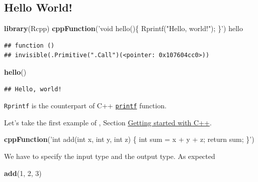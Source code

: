 \documentclass[]{book}
\newenvironment{Shaded}{\begin{snugshade}}{\end{snugshade}}
\newcommand{\KeywordTok}[1]{\textcolor[rgb]{0.13,0.29,0.53}{\textbf{#1}}}
\newcommand{\DecValTok}[1]{\textcolor[rgb]{0.00,0.00,0.81}{#1}}
\newcommand{\StringTok}[1]{\textcolor[rgb]{0.31,0.60,0.02}{#1}}
\newcommand{\NormalTok}[1]{#1}
\theoremstyle{definition}
\theoremstyle{definition}
\theoremstyle{definition}
\theoremstyle{remark}
\begin{document}
\subsection{Hello World!}\label{hello-world}

\begin{Shaded}
\begin{Highlighting}[]
\KeywordTok{library}\NormalTok{(Rcpp)}
\KeywordTok{cppFunction}\NormalTok{(}\StringTok{'void hello()\{}
\StringTok{  Rprintf("Hello, world!");}
\StringTok{\}'}\NormalTok{)}
\NormalTok{hello}
\end{Highlighting}
\end{Shaded}

\begin{verbatim}
## function () 
## invisible(.Primitive(".Call")(<pointer: 0x107604cc0>))
\end{verbatim}

\begin{Shaded}
\begin{Highlighting}[]
\KeywordTok{hello}\NormalTok{()}
\end{Highlighting}
\end{Shaded}

\begin{verbatim}
## Hello, world!
\end{verbatim}

\texttt{Rprintf} is the counterpart of C++
\href{http://www.cplusplus.com/reference/cstdio/printf/}{\texttt{printf}}
function.

Let's take the first example of \citet{Wickham2014}, Section
\href{http://adv-r.had.co.nz/Rcpp.html\#rcpp-intro}{Getting started with
C++}.

\begin{Shaded}
\begin{Highlighting}[]
\KeywordTok{cppFunction}\NormalTok{(}\StringTok{'int add(int x, int y, int z) \{}
\StringTok{  int sum = x + y + z;}
\StringTok{  return sum;}
\StringTok{\}'}\NormalTok{)}
\end{Highlighting}
\end{Shaded}

We have to specify the input type and the output type. As expected

\begin{Shaded}
\begin{Highlighting}[]
\KeywordTok{add}\NormalTok{(}\DecValTok{1}\NormalTok{, }\DecValTok{2}\NormalTok{, }\DecValTok{3}\NormalTok{)}
\end{Highlighting}
\end{Shaded}
\end{document}
